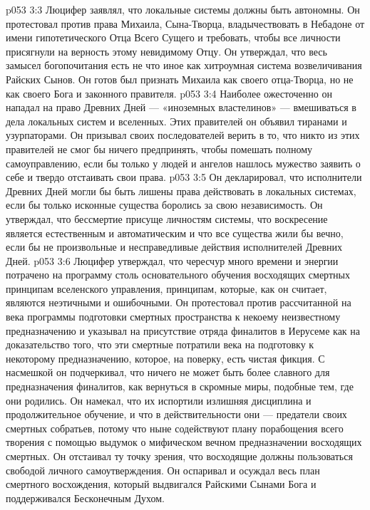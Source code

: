 \vs p053 3:3 \pc {}\bibnobreakspace {} Люцифер заявлял, что локальные системы должны быть автономны. Он протестовал против права Михаила, Сына\hyp{}Творца, владычествовать в Небадоне от имени гипотетического Отца Всего Сущего и требовать, чтобы все личности присягнули на верность этому невидимому Отцу. Он утверждал, что весь замысел богопочитания есть не что иное как хитроумная система возвеличивания Райских Сынов. Он готов был признать Михаила как своего отца\hyp{}Творца, но не как своего Бога и законного правителя.
\vs p053 3:4 Наиболее ожесточенно он нападал на право Древних Дней --- «иноземных властелинов» --- вмешиваться в дела локальных систем и вселенных. Этих правителей он объявил тиранами и узурпаторами. Он призывал своих последователей верить в то, что никто из этих правителей не смог бы ничего предпринять, чтобы помешать полному самоуправлению, если бы только у людей и ангелов нашлось мужество заявить о себе и твердо отстаивать свои права.
\vs p053 3:5 Он декларировал, что исполнители Древних Дней могли бы быть лишены права действовать в локальных системах, если бы только исконные существа боролись за свою независимость. Он утверждал, что бессмертие присуще личностям системы, что воскресение является естественным и автоматическим и что все существа жили бы вечно, если бы не произвольные и несправедливые действия исполнителей Древних Дней.
\vs p053 3:6 \pc {}\bibnobreakspace {} Люцифер утверждал, что чересчур много времени и энергии потрачено на программу столь основательного обучения восходящих смертных принципам вселенского управления, принципам, которые, как он считает, являются неэтичными и ошибочными. Он протестовал против рассчитанной на века программы подготовки смертных пространства к некоему неизвестному предназначению и указывал на присутствие отряда финалитов в Иерусеме как на доказательство того, что эти смертные потратили века на подготовку к некоторому предназначению, которое, на поверку, есть чистая фикция. С насмешкой он подчеркивал, что ничего не может быть более славного для предназначения финалитов, как вернуться в скромные миры, подобные тем, где они родились. Он намекал, что их испортили излишняя дисциплина и продолжительное обучение, и что в действительности они --- предатели своих смертных собратьев, потому что ныне содействуют плану порабощения всего творения с помощью выдумок о мифическом вечном предназначении восходящих смертных. Он отстаивал ту точку зрения, что восходящие должны пользоваться свободой личного самоутверждения. Он оспаривал и осуждал весь план смертного восхождения, который выдвигался Райскими Сынами Бога и поддерживался Бесконечным Духом.
